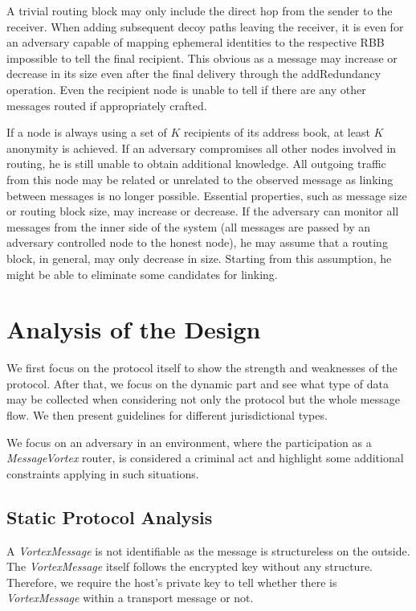 \documentclass[acmsmall, screen, review]{acmart}
\begin{document}
	A trivial routing block may only include the direct hop from the sender to the receiver. When adding subsequent decoy paths leaving the receiver, it is even for an adversary capable of mapping ephemeral identities to the respective RBB impossible to tell the final recipient. This obvious as a message may increase or decrease in its size even after the final delivery through the addRedundancy operation. Even the recipient node is unable to tell if there are any other messages routed if appropriately crafted.
	
	If a node is always using a set of $K$ recipients of its address book, at least $K$ anonymity is achieved. If an adversary compromises all other nodes involved in routing, he is still unable to obtain additional knowledge. All outgoing traffic from this node may be related or unrelated to the observed message as linking between messages is no longer possible. Essential properties, such as message size or routing block size, may increase or decrease. If the adversary can monitor all messages from the inner side of the system (all messages are passed by an adversary controlled node to the honest node), he may assume that a routing block, in general, may only decrease in size. Starting from this assumption, he might be able to eliminate some candidates for linking.
	
	\section{Analysis of the Design\label{sec:discussion}}
	We first focus on the protocol itself to show the strength and weaknesses of the protocol. After that, we focus on the dynamic part and see what type of data may be collected when considering not only the protocol but the whole message flow. We then present guidelines for different jurisdictional types.
	
	We focus on an adversary in an environment, where the participation as a \emph{MessageVortex} router, is considered a criminal act and highlight some additional constraints applying in such situations.
	
	\subsection{Static Protocol Analysis\label{sec:staticAnalysis}}
	A \emph{VortexMessage} is not identifiable as the message is structureless on the outside. The \emph{VortexMessage} itself follows the encrypted key without any structure. Therefore, we require the host's private key to tell whether there is \emph{VortexMessage} within a transport message or not.
	
\end{document}
